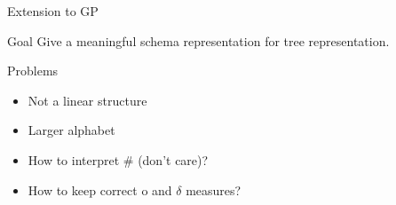\begin{frame}{Extension to GP}
  \begin{block}{Goal}
    Give a meaningful schema representation for tree representation.
  \end{block}

  \begin{block}{Problems}
    \begin{itemize}
      \item Not a linear structure
      \item Larger alphabet
      \item How to interpret \# (don't care)?
      \item How to keep correct o and $\delta$ measures?
    \end{itemize}
  \end{block}
\end{frame}

